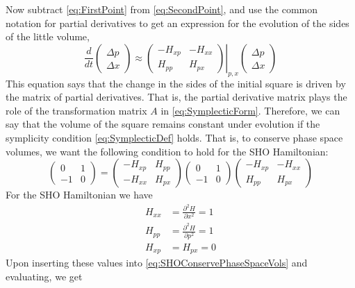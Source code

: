 \documentclass[hidelinks,notitlepage]{book}
\begin{document}
Now subtract \cref{eq:FirstPoint} from \cref{eq:SecondPoint}, and use the common notation for partial derivatives to get an expression for the evolution of the sides of the little volume,
\begin{equation}
\nonumber
\frac{d}{dt}
\begin{pmatrix}
\Delta p \\
\Delta x
\end{pmatrix}
\approx
\left.
\begin{pmatrix}
-H_{xp} & -H_{xx} \\
H_{pp} & H_{px}
\end{pmatrix}
\right|_{p,x}
\begin{pmatrix}
\Delta p \\
\Delta x
\end{pmatrix}
\end{equation}
This equation says that the change in the sides of the initial square is driven by the matrix of partial derivatives.  That is, the partial derivative matrix plays the role of the transformation matrix $A$ in \cref{eq:SymplecticForm}.  Therefore, we can say that the volume of the square remains constant under evolution if the symplicity condition \cref{eq:SymplecticDef} holds.  That is, to conserve phase space volumes, we want the following condition to hold for the SHO Hamiltonian:
\begin{equation}
\label{eq:SHOConservePhaseSpaceVols}
\begin{pmatrix}
0 & 1 \\
-1 & 0
\end{pmatrix}
=
\begin{pmatrix}
-H_{xp} & H_{pp} \\
-H_{xx} & H_{px}
\end{pmatrix}
\begin{pmatrix}
0 & 1 \\
-1 & 0
\end{pmatrix}
\begin{pmatrix}
-H_{xp} & -H_{xx} \\
H_{pp} & H_{px}
\end{pmatrix}
\end{equation}
For the SHO Hamiltonian we have
\begin{align}
\nonumber
H_{xx} &= \frac{\partial^2 H}{\partial x^2} = 1 \\
\nonumber
H_{pp} &= \frac{\partial^2 H}{\partial p^2} = 1 \\
\nonumber
H_{xp} &= H_{px} = 0
\end{align}
Upon inserting these values into \cref{eq:SHOConservePhaseSpaceVols} and evaluating, we get
\end{document}
